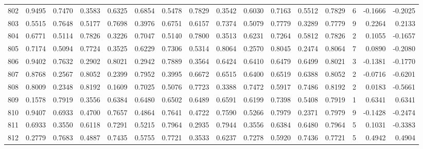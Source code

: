 \begin{tabular}{lrrrrrrrrrrrrrrr}
802 &      0.9495 &  0.7470 &  0.3583 &  0.6325 &  0.6854 &  0.5478 &  0.7829 &  0.3542 &  0.6030 &  0.7163 &   0.5512 &     0.7829 &      6 &                   -0.1666 &                    -0.2025 \\
803 &      0.5515 &  0.7648 &  0.5177 &  0.7698 &  0.3976 &  0.6751 &  0.6157 &  0.7374 &  0.5079 &  0.7779 &   0.3289 &     0.7779 &      9 &                    0.2264 &                     0.2133 \\
804 &      0.6771 &  0.5114 &  0.7826 &  0.3226 &  0.7047 &  0.5140 &  0.7800 &  0.3513 &  0.6231 &  0.7264 &   0.5812 &     0.7826 &      2 &                    0.1055 &                    -0.1657 \\
805 &      0.7174 &  0.5094 &  0.7724 &  0.3525 &  0.6229 &  0.7306 &  0.5314 &  0.8064 &  0.2570 &  0.8045 &   0.2474 &     0.8064 &      7 &                    0.0890 &                    -0.2080 \\
806 &      0.9402 &  0.7632 &  0.2902 &  0.8021 &  0.2942 &  0.7889 &  0.3564 &  0.6424 &  0.6410 &  0.6479 &   0.6499 &     0.8021 &      3 &                   -0.1381 &                    -0.1770 \\
807 &      0.8768 &  0.2567 &  0.8052 &  0.2399 &  0.7952 &  0.3995 &  0.6672 &  0.6515 &  0.6400 &  0.6519 &   0.6388 &     0.8052 &      2 &                   -0.0716 &                    -0.6201 \\
808 &      0.8009 &  0.2348 &  0.8192 &  0.1609 &  0.7025 &  0.5076 &  0.7723 &  0.3388 &  0.7472 &  0.5917 &   0.7486 &     0.8192 &      2 &                    0.0183 &                    -0.5661 \\
809 &      0.1578 &  0.7919 &  0.3556 &  0.6384 &  0.6480 &  0.6502 &  0.6489 &  0.6591 &  0.6199 &  0.7398 &   0.5408 &     0.7919 &      1 &                    0.6341 &                     0.6341 \\
810 &      0.9407 &  0.6933 &  0.4700 &  0.7657 &  0.4864 &  0.7641 &  0.4722 &  0.7590 &  0.5266 &  0.7979 &   0.2371 &     0.7979 &      9 &                   -0.1428 &                    -0.2474 \\
811 &      0.6933 &  0.3550 &  0.6118 &  0.7291 &  0.5215 &  0.7964 &  0.2935 &  0.7944 &  0.3556 &  0.6384 &   0.6480 &     0.7964 &      5 &                    0.1031 &                    -0.3383 \\
812 &      0.2779 &  0.7683 &  0.4887 &  0.7435 &  0.5755 &  0.7721 &  0.3533 &  0.6237 &  0.7278 &  0.5920 &   0.7436 &     0.7721 &      5 &                    0.4942 &                     0.4904 \\

\end{tabular}
